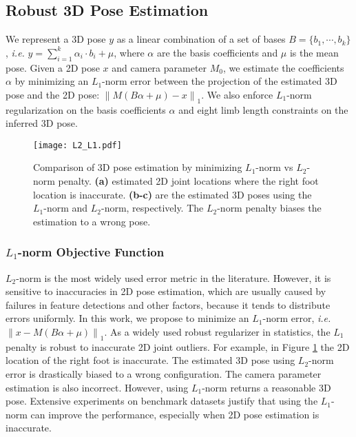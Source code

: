 \documentclass[10pt,twocolumn,letterpaper]{article}
\begin{document}
\subsection{Robust 3D Pose Estimation}
\label{sec:3d_pose_sec} We represent a 3D pose $y$ as a linear
combination of a set of bases $B=\{b_1, \cdots, b_k\}$, {\em i.e.}
$y=\sum_{i=1}^k{\alpha_i \cdot b_i} + \mu $, where $\alpha$ are
the basis coefficients and $\mu$ is the mean pose. Given a 2D pose
$x$ and camera parameter $M_0$, we estimate the coefficients
$\alpha$ by minimizing an $L_1$-norm error between the projection of
the estimated 3D pose and the 2D pose: $\left\| M \left( B \alpha
+ \mu \right)-x \right\|_1$. We also enforce $L_1$-norm
regularization on the basis coefficients $\alpha$ and eight limb
length constraints on the inferred 3D pose.

\begin{figure}[th]
\centering
\texttt{[image: L2\_L1.pdf]}
\caption{Comparison of 3D pose estimation by minimizing $L_1$-norm
vs $L_2$-norm penalty. \textbf{(a)} estimated 2D joint
locations where the right foot location is inaccurate.
\textbf{(b-c)} are the estimated 3D poses using the $L_1$-norm and
$L_2$-norm, respectively. The $L_2$-norm penalty biases the
estimation to a wrong pose.}
\vspace{-1em} \label{fig:L1_L2_sample}
\end{figure}

\subsubsection{$L_1$-norm Objective Function}
\label{sec:l1norm} $L_2$-norm is the most widely used
error metric in the literature. However, it is
sensitive to inaccuracies in 2D pose estimation, which are usually
caused by failures in feature detections and other factors,
because it tends to distribute errors uniformly. In this work, we
propose to minimize an $L_1$-norm error, {\em i.e.} $\left\| x-M (B \alpha
+\mu) \right\|_1$. As a widely used robust regularizer in statistics, the
$L_1$ penalty is robust to inaccurate 2D joint outliers. For
example, in Figure \ref{fig:L1_L2_sample} the 2D location of the
right foot is inaccurate. The estimated 3D pose using $L_2$-norm
error is drastically biased to a wrong configuration. The
camera parameter estimation is also incorrect. However, using
$L_1$-norm returns a reasonable 3D pose. Extensive experiments on
benchmark datasets justify that using the $L_1$-norm can improve
the performance, especially when 2D pose estimation is
inaccurate.
\end{document}
